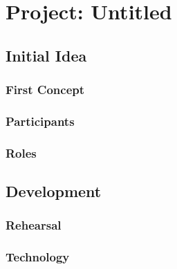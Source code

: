 
\chapter{Project: Untitled} %

\label{Chapter5} %

\section{Initial Idea}

\subsection{First Concept}

\subsection{Participants}

\subsection{Roles}

\section{Development}

\subsection{Rehearsal}

\subsection{Technology}

